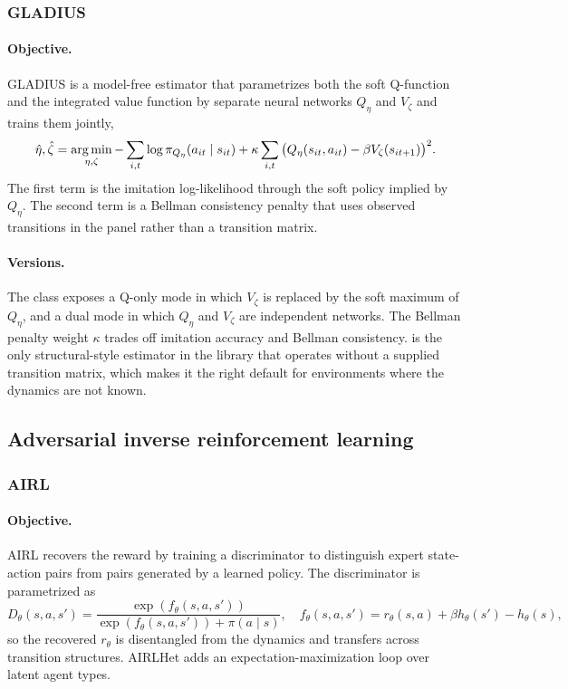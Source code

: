 \subsubsection{GLADIUS}

\paragraph{Objective.} GLADIUS \citep{kang2025gladius} is a model-free estimator that parametrizes both the soft Q-function and the integrated value function by separate neural networks $Q_\eta$ and $V_\zeta$ and trains them jointly,
\begin{equation}
\hat\eta, \hat\zeta = \operatorname*{arg\,min}_{\eta, \zeta} -\sum_{i, t} \log \pi_{Q_\eta}(a_{it} \mid s_{it}) + \kappa \sum_{i, t} \big( Q_\eta(s_{it}, a_{it}) - \beta V_\zeta(s_{it+1}) \big)^2.
\label{eq:gladius}
\end{equation}
The first term is the imitation log-likelihood through the soft policy implied by $Q_\eta$. The second term is a Bellman consistency penalty that uses observed transitions in the panel rather than a transition matrix.

\paragraph{Versions.} The  class exposes a Q-only mode in which $V_\zeta$ is replaced by the soft maximum of $Q_\eta$, and a dual mode in which $Q_\eta$ and $V_\zeta$ are independent networks. The Bellman penalty weight $\kappa$ trades off imitation accuracy and Bellman consistency.  is the only structural-style estimator in the library that operates without a supplied transition matrix, which makes it the right default for environments where the dynamics are not known.

\subsection{Adversarial inverse reinforcement learning}

\subsubsection{AIRL}

\paragraph{Objective.} AIRL \citep{fu2018} recovers the reward by training a discriminator to distinguish expert state-action pairs from pairs generated by a learned policy. The discriminator is parametrized as
\begin{equation}
D_\theta(s, a, s') = \frac{\exp(f_\theta(s, a, s'))}{\exp(f_\theta(s, a, s')) + \pi(a \mid s)},
\quad f_\theta(s, a, s') = r_\theta(s, a) + \beta h_\theta(s') - h_\theta(s),
\label{eq:airl}
\end{equation}
so the recovered $r_\theta$ is disentangled from the dynamics and transfers across transition structures. AIRLHet \citep{lee2026airlhet} adds an expectation-maximization loop over latent agent types.

